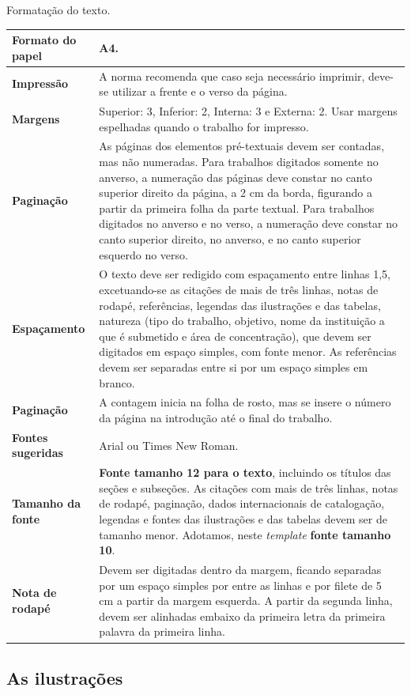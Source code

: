 \documentclass[
	12pt,				%
	oneside,			%
	a4paper,			%
	chapter=TITLE,		%
	section=TITLE,		%
	english,			%
	brazil				%
	]{abntex2}
\begin{document}
\begin{quadro}[htb]
    \centering
    \caption{\label{qua:Quadro-1}Formatação do texto.}  
    \begin{tabular}{|l|p{11cm}|}
        \hline
        \textbf{Formato do papel} & A4.\\ \hline
        \textbf{Impressão}        & A norma recomenda que caso seja necessário imprimir, deve-se utilizar a frente e o verso da página.\\ \hline
        \textbf{Margens}          & Superior: 3, Inferior: 2, Interna: 3 e Externa: 2. Usar margens espelhadas quando o  trabalho for impresso.\\ \hline
        \textbf{Paginação}        & As páginas dos elementos pré-textuais devem ser contadas, mas não numeradas. Para trabalhos digitados somente no anverso, a numeração das páginas deve constar no canto superior direito da página, a 2 cm da borda, figurando a partir da primeira folha da  parte textual. Para trabalhos digitados no anverso e no verso, a numeração deve constar no canto superior direito, no anverso, e no canto superior esquerdo no verso.\\ \hline
        \textbf{Espaçamento}      & O texto deve ser redigido com espaçamento entre linhas 1,5, excetuando-se as citações de mais de três linhas, notas de rodapé, referências, legendas das ilustrações e das tabelas, natureza (tipo do trabalho, objetivo, nome da instituição a que é submetido e área de concentração), que devem ser digitados em espaço simples, com fonte menor. As referências devem ser separadas entre si por um espaço simples em branco.\\ \hline
        \textbf{Paginação}        & A contagem inicia na folha de rosto, mas se insere o número da página na introdução até o final do trabalho.\\ \hline
        \textbf{Fontes sugeridas} & Arial ou Times New Roman.\\ \hline
        \textbf{Tamanho da fonte} & \textbf{Fonte tamanho 12 para o texto}, incluindo os títulos das seções e subseções. As citações com mais de três linhas, notas de rodapé, paginação, dados internacionais de catalogação, legendas e fontes das ilustrações e das tabelas devem ser de tamanho menor. Adotamos, neste \textit{template} \textbf{fonte tamanho 10}.\\ \hline
        \textbf{Nota de rodapé}   & Devem ser digitadas dentro da margem, ficando separadas por um espaço simples por entre as linhas e por filete de 5 cm a partir da margem esquerda. A partir da segunda linha, devem ser alinhadas embaixo da primeira letra da primeira palavra da primeira linha.\\ \hline
    \end{tabular}
\end{quadro}
\hypertarget{as-ilustrauxe7uxf5es}{%
\subsection{As ilustrações}\label{as-ilustrauxe7uxf5es}}
\end{document}
